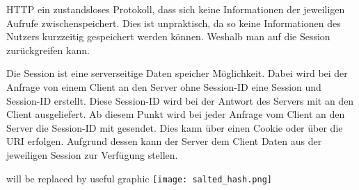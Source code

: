 \documentclass[11pt]{article}
\begin{document}
		\begin{flushleft}
			HTTP ein zustandsloses Protokoll, dass sich keine Informationen der jeweiligen Aufrufe zwischenspeichert. Dies ist unpraktisch, da so keine Informationen des Nutzers kurzzeitig gespeichert werden können. Weshalb man auf die Session zurückgreifen kann. \par\bigskip
		
		
			Die Session ist eine serverseitige Daten speicher Möglichkeit. Dabei wird bei der Anfrage von einem Client an den Server ohne Session-ID eine Session und Session-ID erstellt. Diese Session-ID wird bei der Antwort des Servers mit an den Client ausgeliefert. Ab diesem Punkt wird bei jeder Anfrage vom Client an den Server die Session-ID mit gesendet. Dies kann über einen Cookie oder über die URI erfolgen. Aufgrund dessen kann der Server dem Client Daten aus der jeweiligen Session zur Verfügung stellen. 
			
			\begin{center}
				will be replaced by useful graphic
				\texttt{[image: salted\_hash.png]}
			\end{center}
			
		\end{flushleft}
		
\end{document}
